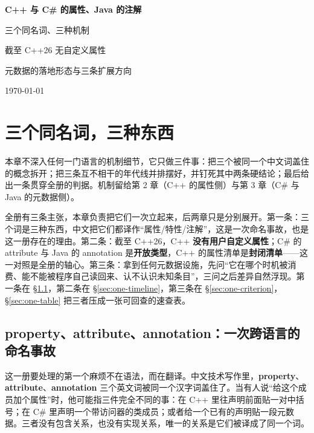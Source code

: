 \documentclass[12pt,a4paper,fontset=fandol]{ctexbook}
\newcommand{\cpp}[1]{C++#1}
\begin{document}
\frontmatter

\begin{titlepage}
\centering
\vspace*{4cm}
{\Huge\bfseries C++ 与 C\# 的属性、Java 的注解\par}
\vspace{1cm}
{\LARGE 三个同名词、三种机制\par}
\vspace{0.35cm}
{\LARGE 截至 \cpp{26} 无自定义属性\par}
\vspace{0.35cm}
{\LARGE 元数据的落地形态与三条扩展方向\par}
\vfill
{\large \today\par}
\end{titlepage}

\tableofcontents

\mainmatter

\chapter{三个同名词，三种东西}
\label{ch:one}

本章不深入任何一门语言的机制细节，它只做三件事：把三个被同一个中文词盖住的概念拆开；把三条互不相干的年代线并排摆好，并钉死其中两条硬结论；最后给出一条贯穿全册的判据。机制留给第 2 章（C++ 的属性侧）与第 3 章（C\# 与 Java 的元数据侧）。

全册有三条主张，本章负责把它们一次立起来，后两章只是分别展开。第一条：三个词是三种东西，中文把它们都译作“属性/特性/注解”，这是一次命名事故，也是这一册存在的理由。第二条：截至 \cpp{26}，\cpp{} \textbf{没有用户自定义属性}；C\# 的 attribute 与 Java 的 annotation 是\textbf{开放类型}，\cpp{} 的属性清单是\textbf{封闭清单}——这一对照是全册的轴心。第三条：拿到任何元数据设施，先问“它在哪个时机被消费、能不能被程序自己读回来、认不认识未知条目”，三问之后差异自然浮现。第一条在 \S\ref{sec:one-names}，第二条在 \S\ref{sec:one-timeline}，第三条在 \S\ref{sec:one-criterion}，\S\ref{sec:one-table} 把三者压成一张可回查的速查表。

\section{property、attribute、annotation：一次跨语言的命名事故}
\label{sec:one-names}

这一册要处理的第一个麻烦不在语法，而在翻译。中文技术写作里，\textbf{property}、\textbf{attribute}、\textbf{annotation} 三个英文词被同一个汉字词盖住了。当有人说“给这个成员加个属性”时，他可能指三件完全不同的事：在 \cpp{} 里往声明前面贴一对中括号；在 C\# 里声明一个带访问器的类成员；或者给一个已有的声明贴一段元数据。三者没有包含关系，也没有实现关系，唯一的关系是它们被译成了同一个词。
\end{document}
